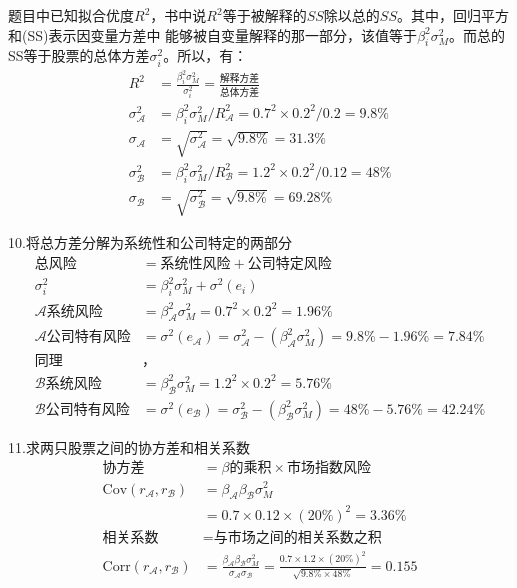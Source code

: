 \documentclass{article}
\begin{document}
题目中已知拟合优度$R^2$，书中说$R^2$等于被解释的$SS$除以总的$SS$。其中，回归平方和(SS)表示因变量方差中
能够被自变量解释的那一部分，该值等于$\beta_i^2\sigma_M^2$。而总的SS等于股票的总体方差$\sigma_i^2$。所以，有：
\begin{align}
    R^2&=\frac{\beta_i^2\sigma_M^2}{\sigma_i^2}=\frac{\text{解释方差}}{\text{总体方差}}\\
    \sigma_\mathcal{A} ^2&=\beta_i^2\sigma_M^2/R_\mathcal{A} ^2=0.7^2\times 0.2^2/0.2=9.8\%\\
    \sigma_\mathcal{A}&=\sqrt{\sigma_\mathcal{A}^2}=\sqrt{9.8\%}=31.3\%\\
    \sigma_\mathcal{B} ^2&=\beta_i^2\sigma_M^2/R_\mathcal{B} ^2=1.2^2\times 0.2^2/0.12=48\%\\
    \sigma_\mathcal{B}&=\sqrt{\sigma_\mathcal{B}^2}=\sqrt{9.8\%}=69.28\%
\end{align}

10.将总方差分解为系统性和公司特定的两部分
\begin{align}
    \text{总风险}&=\text{系统性风险}+\text{公司特定风险}\\
    \sigma_i^2&=\beta_i^2\sigma_M^2+\sigma^2(e_i)\\
    \mathcal{A} \text{系统风险}&=\beta_\mathcal{A} ^2\sigma_M^2=0.7^2\times 0.2^2=1.96\%\\
    \mathcal{A} \text{公司特有风险}&=\sigma^2(e_\mathcal{A} )=\sigma_\mathcal{A} ^2-(\beta_\mathcal{A} ^2\sigma_M^2)=9.8\%-1.96\%=7.84\%\\
    \text{同理}&\text{，}\\
    \mathcal{B} \text{系统风险}&=\beta_\mathcal{B} ^2\sigma_M^2=1.2^2\times 0.2^2=5.76\%\\
    \mathcal{B} \text{公司特有风险}&=\sigma^2(e_\mathcal{B} )=\sigma_\mathcal{B} ^2-(\beta_\mathcal{B} ^2\sigma_M^2)=48\%-5.76\%=42.24\%
\end{align}

11.求两只股票之间的协方差和相关系数
\begin{align}
    \text{协方差}&=\beta\text{的乘积}\times\text{市场指数风险}\\
    \text{Cov}(r_\mathcal{A} ,r_\mathcal{B} )&=\beta_\mathcal{A} \beta_\mathcal{B} \sigma_M^2\\
    &=0.7\times 0.12\times (20\%)^2=3.36\%\\
    \text{相关系数}&=\text{与市场之间的相关系数之积}\\
    \text{Corr}(r_\mathcal{A} ,r_\mathcal{B})&=\frac{\beta_\mathcal{A} \beta_\mathcal{B} \sigma_M^2}{\sigma_\mathcal{A} \sigma_\mathcal{B}}=\frac{0.7\times 1.2\times(20\%)^2}{\sqrt{9.8\%\times 48\%}}=0.155
\end{align}
\end{document}
